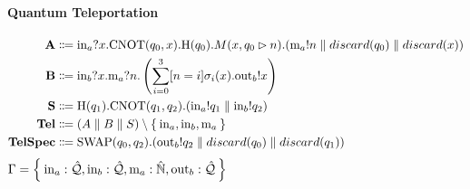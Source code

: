   
  
\paragraph{Quantum Teleportation}
\begin{align*}
  \text{\textbf{A}} &\Coloneqq \text{in}_a?x.\text{CNOT}(q_0, x).\text{H}(q_0).M(x,q_0 \rhd n).(\text{m}_a!n \parallel discard(q_0) \parallel discard(x) )\\
  \text{\textbf{B}} &\Coloneqq \text{in}_b?x.\text{m}_a?n.\left(\sum_{i = 0}^3 [n = i]\sigma_i(x).\text{out}_b!x\right) \\
  \text{\textbf{S}} &\Coloneqq \text{H}(q_1).\text{CNOT}(q_1, q_2).(\text{in}_a!q_1 \parallel \text{in}_b!q_2) \\
  \text{\textbf{Tel}} &\Coloneqq (A \parallel B \parallel S) \setminus \Set{\text{in}_a, \text{in}_b, \text{m}_a } \\
  \text{\textbf{TelSpec}} &\Coloneqq \text{SWAP}(q_0,q_2).(\text{out}_b!q_2 \parallel discard(q_0) \parallel discard(q_1))
\end{align*}
$\Gamma = \Set{\text{in}_a : \hat{\mathcal{Q}}, \text{in}_b : \hat{\mathcal{Q}}, \text{m}_a : \hat{\mathbb{N}}, \text{out}_b : \hat{\mathcal{Q}}}$